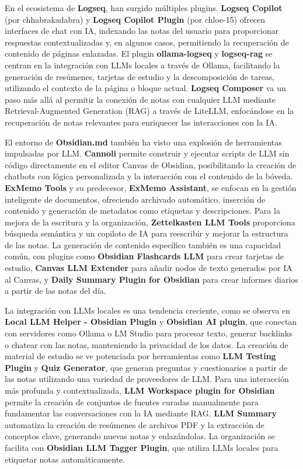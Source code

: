 En el ecosistema de \textbf{Logseq}, han surgido múltiples plugins. \textbf{Logseq Copilot} (por chhabrakadabra) y \textbf{Logseq Copilot Plugin} (por chloe-15) ofrecen interfaces de chat con IA, indexando las notas del usuario para proporcionar respuestas contextualizadas y, en algunos casos, permitiendo la recuperación de contenido de páginas enlazadas. El plugin \textbf{ollama-logseq} y \textbf{logseq-rag} se centran en la integración con LLMs locales a través de Ollama, facilitando la generación de resúmenes, tarjetas de estudio y la descomposición de tareas, utilizando el contexto de la página o bloque actual. \textbf{Logseq Composer} va un paso más allá al permitir la conexión de notas con cualquier LLM mediante Retrieval-Augmented Generation (RAG) a través de LiteLLM, enfocándose en la recuperación de notas relevantes para enriquecer las interacciones con la IA.

El entorno de \textbf{Obsidian.md} también ha visto una explosión de herramientas impulsadas por LLM. \textbf{Cannoli} permite construir y ejecutar scripts de LLM sin código directamente en el editor Canvas de Obsidian, posibilitando la creación de chatbots con lógica personalizada y la interacción con el contenido de la bóveda. \textbf{ExMemo Tools} y su predecesor, \textbf{ExMemo Assistant}, se enfocan en la gestión inteligente de documentos, ofreciendo archivado automático, inserción de contenido y generación de metadatos como etiquetas y descripciones. Para la mejora de la escritura y la organización, \textbf{Zettelkasten LLM Tools} proporciona búsqueda semántica y un copiloto de IA para reescribir y mejorar la estructura de las notas. La generación de contenido específico también es una capacidad común, con plugins como \textbf{Obsidian Flashcards LLM} para crear tarjetas de estudio, \textbf{Canvas LLM Extender} para añadir nodos de texto generados por IA al Canvas, y \textbf{Daily Summary Plugin for Obsidian} para crear informes diarios a partir de las notas del día.

La integración con LLMs locales es una tendencia creciente, como se observa en \textbf{Local LLM Helper - Obsidian Plugin} y \textbf{Obsidian AI plugin}, que conectan con servidores como Ollama o LM Studio para procesar texto, generar backlinks o chatear con las notas, manteniendo la privacidad de los datos. La creación de material de estudio se ve potenciada por herramientas como \textbf{LLM Testing Plugin} y \textbf{Quiz Generator}, que generan preguntas y cuestionarios a partir de las notas utilizando una variedad de proveedores de LLM. Para una interacción más profunda y contextualizada, \textbf{LLM Workspace plugin for Obsidian} permite la creación de conjuntos de fuentes curadas manualmente para fundamentar las conversaciones con la IA mediante RAG. \textbf{LLM Summary} automatiza la creación de resúmenes de archivos PDF y la extracción de conceptos clave, generando nuevas notas y enlazándolas. La organización se facilita con \textbf{Obsidian LLM Tagger Plugin}, que utiliza LLMs locales para etiquetar notas automáticamente.

